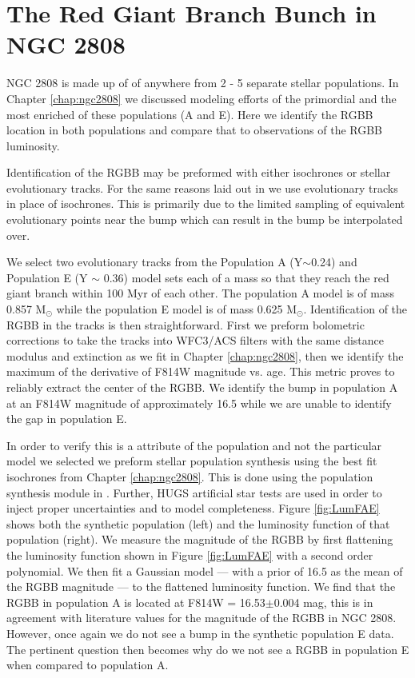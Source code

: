 \section{The Red Giant Branch Bunch in NGC 2808}
NGC 2808 is made up of of anywhere from 2 - 5 separate stellar populations. In
Chapter \ref{chap:ngc2808} we discussed modeling efforts of the primordial
and the most enriched of these populations (A and E). Here we identify the
RGBB location in both populations and compare that to observations of the RGBB
luminosity.

Identification of the RGBB may be preformed with either isochrones or stellar
evolutionary tracks. For the same reasons laid out in \citet{Joyce2016} we use
evolutionary tracks in place of isochrones. This is primarily due to the
limited sampling of equivalent evolutionary points near the bump which can
result in the bump be interpolated over. 

We select two evolutionary tracks from the Population A (Y$\sim$0.24) and
Population E (Y $\sim$ 0.36) model sets each of a mass so that they reach the
red giant branch within 100 Myr of each other. The population A model is of
mass 0.857 M$_{\odot}$ while the population E model is of mass 0.625
M$_{\odot}$. Identification of the RGBB in the tracks is then straightforward.
First we preform bolometric corrections to take the tracks into WFC3/ACS
filters with the same distance modulus and extinction as we fit in Chapter
\ref{chap:ngc2808}, then we identify the maximum of the derivative of F814W
magnitude vs. age. This metric proves to reliably extract the center of the
RGBB. We identify the bump in population A at an F814W magnitude of approximately 16.5 while
we are unable to identify the gap in population E.

In order to verify this is a attribute of the population and not the particular
model we selected we preform stellar population synthesis using the best fit
isochrones from Chapter \ref{chap:ngc2808}. This is done using the population
synthesis module in \fidanka. Further, HUGS artificial star tests are used in
order to inject proper uncertainties and to model completeness. Figure
\ref{fig:LumFAE} shows both the synthetic population (left) and the luminosity
function of that population (right). We measure the magnitude of the RGBB by
first flattening the luminosity function shown in Figure \ref{fig:LumFAE} with
a second order polynomial. We then fit a Gaussian model --- with a prior of
16.5 as the mean of the RGBB magnitude --- to the flattened luminosity function.
We find that the RGBB in population A is located at F814W = 16.53$\pm$0.004
mag, this is in agreement with literature values for the magnitude of the RGBB
in NGC 2808. However, once again we do not see a bump in the synthetic
population E data. The pertinent question then becomes why do we not see a
RGBB in population E when compared to population A.

